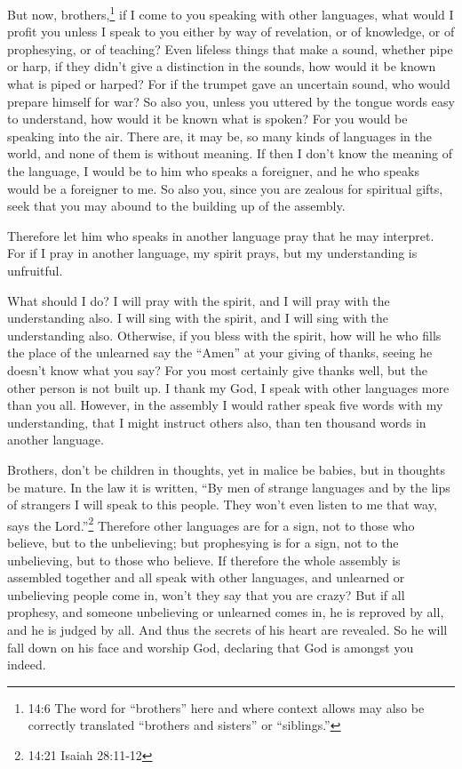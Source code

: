  But now, brothers,\footnote{14:6 The word for ``brothers''
  here and where context allows may also be correctly translated
  ``brothers and sisters'' or ``siblings.''} if I come to you speaking
with other languages, what would I profit you unless I speak to you
either by way of revelation, or of knowledge, or of prophesying, or of
teaching?  Even lifeless things that make a sound, whether
pipe or harp, if they didn't give a distinction in the sounds, how would
it be known what is piped or harped?  For if the trumpet
gave an uncertain sound, who would prepare himself for war? 
So also you, unless you uttered by the tongue words easy to understand,
how would it be known what is spoken? For you would be speaking into the
air.  There are, it may be, so many kinds of languages in
the world, and none of them is without meaning.  If then I
don't know the meaning of the language, I would be to him who speaks a
foreigner, and he who speaks would be a foreigner to me. 
So also you, since you are zealous for spiritual gifts, seek that you
may abound to the building up of the assembly.

 Therefore let him who speaks in another language pray that
he may interpret.  For if I pray in another language, my
spirit prays, but my understanding is unfruitful.

 What should I do? I will pray with the spirit, and I will
pray with the understanding also. I will sing with the spirit, and I
will sing with the understanding also.  Otherwise, if you
bless with the spirit, how will he who fills the place of the unlearned
say the ``Amen'' at your giving of thanks, seeing he doesn't know what
you say?  For you most certainly give thanks well, but the
other person is not built up.  I thank my God, I speak with
other languages more than you all.  However, in the
assembly I would rather speak five words with my understanding, that I
might instruct others also, than ten thousand words in another language.

 Brothers, don't be children in thoughts, yet in malice be
babies, but in thoughts be mature.  In the law it is
written, ``By men of strange languages and by the lips of strangers I
will speak to this people. They won't even listen to me that way, says
the Lord.''\footnote{14:21 Isaiah 28:11-12}  Therefore
other languages are for a sign, not to those who believe, but to the
unbelieving; but prophesying is for a sign, not to the unbelieving, but
to those who believe.  If therefore the whole assembly is
assembled together and all speak with other languages, and unlearned or
unbelieving people come in, won't they say that you are crazy?
 But if all prophesy, and someone unbelieving or unlearned
comes in, he is reproved by all, and he is judged by all. 
And thus the secrets of his heart are revealed. So he will fall down on
his face and worship God, declaring that God is amongst you indeed.

